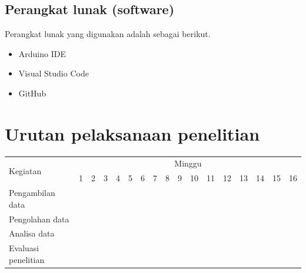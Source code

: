 \subsection {Perangkat lunak (software)}
Perangkat lunak yang digunakan adalah sebagai berikut.
\begin{itemize}
 \item Arduino IDE
 \item Visual Studio Code
 \item GitHub
\end{itemize}


\section{Urutan pelaksanaan penelitian}

\newcommand{\w}{}
\newcommand{\G}{\cellcolor{gray}}
\begin{table}[H]
  \label{tbl:timeline}
  \begin{tabular}{|p{3.5cm}|c|c|c|c|c|c|c|c|c|c|c|c|c|c|c|c|}

    \hline
    \multirow{2}{*}{Kegiatan} & \multicolumn{16}{|c|}{Minggu}                                                                       \\
    \cline{2-17}              &
    1                         & 2                             & 3  & 4  & 5  & 6  & 7  & 8  & 9  & 10 & 11 & 12 & 13 & 14 & 15 & 16 \\
    \hline

    Pengambilan data          &
    \G                        & \G                            & \G & \G & \w & \w & \w & \w & \w & \w & \w & \w & \w & \w & \w & \w \\
    \hline

    Pengolahan data           &
    \w                        & \w                            & \w & \w & \G & \G & \G & \G & \w & \w & \w & \w & \w & \w & \w & \w \\
    \hline

    Analisa data              &
    \w                        & \w                            & \w & \w & \w & \w & \w & \w & \G & \G & \G & \G & \w & \w & \w & \w \\
    \hline

    Evaluasi penelitian       &
    \w                        & \w                            & \w & \w & \w & \w & \w & \w & \w & \w & \w & \w & \G & \G & \G & \G \\
    \hline
  \end{tabular}
\end{table}


